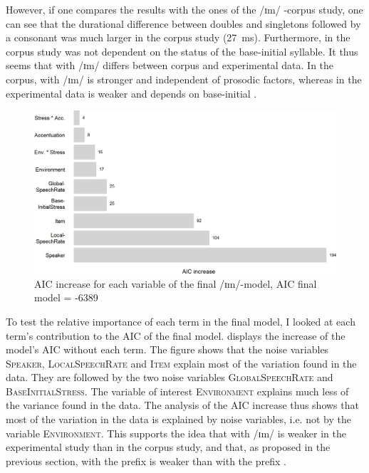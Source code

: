 However, if one compares the results with the ones of the /ɪm/ -corpus study, one can see that the durational difference between doubles and singletons followed by a consonant was much larger in the corpus study (27~ms). Furthermore, in the corpus study  was not dependent on the  status of the base-initial syllable.
It thus seems that  with /ɪm/  differs between corpus and experimental data. In the corpus,  with /ɪm/  is stronger and independent of prosodic factors, whereas in the experimental data  is weaker and depends on base-initial .


\begin{figure}
	\includegraphics[scale=0.7]{images/Experiment/AICdecreaseImComplex.png}
	\caption{AIC increase for each variable of the final /ɪm/-model, AIC final model = -6389}
	\label{fig:Effectsize im experiment}
\end{figure}

To test the relative importance of each term in the final model, I looked at each term's contribution to the AIC of the final model.  displays the increase of the model's AIC  without each term. 
The figure shows that the noise variables \textsc{Speaker}, \textsc{LocalSpeechRate} and \textsc{Item} explain  most of the variation found in the data. They are followed by the two noise variables \textsc{GlobalSpeechRate} and \textsc{BaseInitialStress}. The variable of interest \textsc{Environment} explains much less of the variance found in the data. The analysis of the AIC increase thus shows that most of the variation in the data is explained by noise variables, i.e. not by the variable \textsc{Environment}. This supports the idea that  with /ɪm/  is weaker in the experimental study than in the corpus study, and that, as proposed in the previous section,  with the prefix  is weaker than  with the prefix  . 




